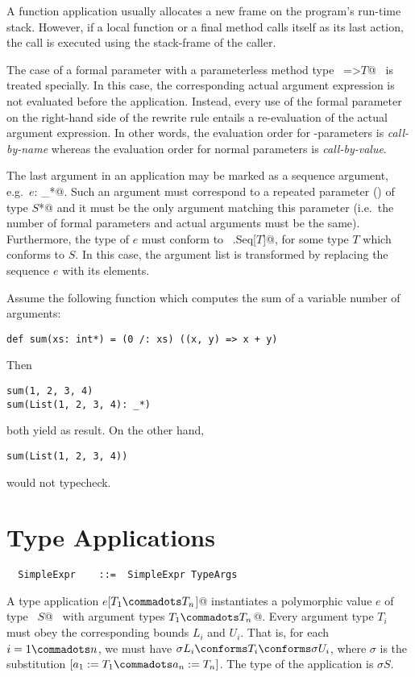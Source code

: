 A function application usually allocates a new frame on the program's
run-time stack. However, if a local function or a final method calls
itself as its last action, the call is executed using the stack-frame
of the caller.

The case of a formal parameter with a parameterless
method type ~\lstinline@=>$T$@~ is treated specially. In this case, the
corresponding actual argument expression is not evaluated before the
application. Instead, every use of the formal parameter on the
right-hand side of the rewrite rule entails a re-evaluation of the
actual argument expression. In other words, the evaluation order for
\code{=>}-parameters is {\em call-by-name} whereas the evaluation
order for normal parameters is {\em call-by-value}.

The last argument in an application may be marked as a sequence
argument, e.g.\ \lstinline@$e$: _*@. Such an argument must correspond
to a repeated parameter () of type
\lstinline@$S$*@ and it must be the only argument matching this
parameter (i.e.\ the number of formal parameters and actual arguments
must be the same). Furthermore, the type of $e$ must conform to
~\lstinline@scala.Seq[$T$]@, for some type $T$ which conforms to
$S$. In this case, the argument list is transformed by replacing the
sequence $e$ with its elements.

\example Assume the following function which computes the sum of a
variable number of arguments:
\begin{lstlisting}
def sum(xs: int*) = (0 /: xs) ((x, y) => x + y)
\end{lstlisting}
Then
\begin{lstlisting}
sum(1, 2, 3, 4)
sum(List(1, 2, 3, 4): _*)
\end{lstlisting}
both yield  as result. On the other hand, 
\begin{lstlisting}
sum(List(1, 2, 3, 4))
\end{lstlisting}
would not typecheck.

\section{Type Applications}
\label{sec:type-app}
\syntax\begin{lstlisting}
  SimpleExpr    ::=  SimpleExpr TypeArgs
\end{lstlisting}

A type application \lstinline@$e$[$T_1 \commadots T_n$]@ instantiates a
polymorphic value $e$ of type
~\lstinline@[$a_1$ >: $L_1$ <: $U_1 \commadots a_n$ >: $L_n$ <: $U_n$]$S$@~ with
argument types \lstinline@$T_1 \commadots T_n$@.  Every argument type
$T_i$ must obey the corresponding bounds $L_i$ and
$U_i$.  That is, for each $i = 1 \commadots n$, we must
have $\sigma L_i  \conforms T_i \conforms \sigma U_i$, where $\sigma$ is the
substitution $[a_1 := T_1 \commadots a_n := T_n]$.  The type
of the application is $\sigma S$.  


